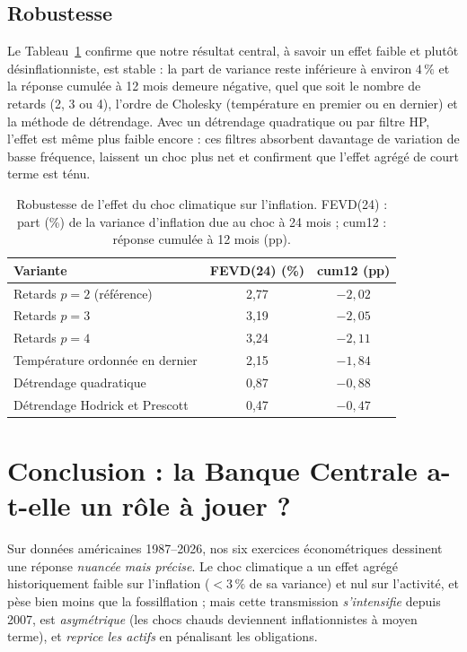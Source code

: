 \documentclass[11pt,a4paper]{article}
\begin{document}
\subsection{Robustesse}
\label{sec:robust}
Le Tableau~\ref{tab:robust} confirme que notre résultat central, à savoir un effet faible et plutôt
désinflationniste, est stable : la part de variance reste inférieure à environ $4\,\%$ et la
réponse cumulée à 12 mois demeure négative, quel que soit le nombre de retards (2, 3 ou 4),
l'ordre de Cholesky (température en premier ou en dernier) et la méthode de
détrendage. Avec un détrendage quadratique ou par filtre HP, l'effet est même plus
faible encore : ces filtres absorbent davantage de variation de basse fréquence, laissent
un choc plus net et confirment que l'effet agrégé de court terme est ténu.

\begin{table}[H]
\centering\small
\caption{Robustesse de l'effet du choc climatique sur l'inflation. FEVD(24) : part (\%) de la
variance d'inflation due au choc à 24 mois ; cum12 : réponse cumulée à 12 mois (pp).}
\label{tab:robust}
\begin{tabular}{lcc}
\toprule
Variante & FEVD(24) (\%) & cum12 (pp) \\
\midrule
Retards $p=2$ (référence) & 2{,}77 & $-2{,}02$ \\
Retards $p=3$ & 3{,}19 & $-2{,}05$ \\
Retards $p=4$ & 3{,}24 & $-2{,}11$ \\
Température ordonnée en dernier & 2{,}15 & $-1{,}84$ \\
Détrendage quadratique & 0{,}87 & $-0{,}88$ \\
Détrendage Hodrick et Prescott & 0{,}47 & $-0{,}47$ \\
\bottomrule
\end{tabular}
\end{table}

\section{Conclusion : la Banque Centrale a-t-elle un rôle à jouer ?}
Sur données américaines 1987--2026, nos six exercices économétriques dessinent une réponse
\emph{nuancée mais précise}. Le choc climatique a un effet agrégé historiquement faible sur
l'inflation ($<3\,\%$ de sa variance) et nul sur l'activité, et pèse bien moins que la
fossilflation ; mais cette transmission \emph{s'intensifie} depuis 2007, est
\emph{asymétrique} (les chocs chauds deviennent inflationnistes à moyen terme), et
\emph{reprice les actifs} en pénalisant les obligations.
\end{document}
